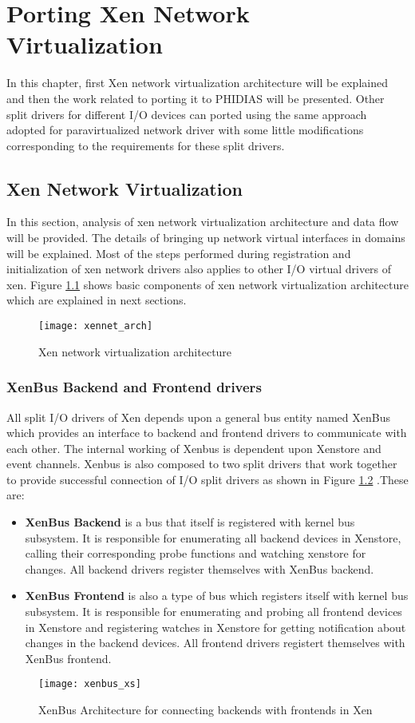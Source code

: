 \chapter{Porting Xen Network Virtualization\label{cha:chapter6}}
In this chapter, first Xen network virtualization architecture will be explained and then the work related to porting it to PHIDIAS will be presented. Other split drivers for different I/O devices can ported using the same approach adopted for paravirtualized network driver with some little modifications corresponding to the requirements for these split drivers.

\section{Xen Network Virtualization \label{sec:xennetwork}}
In this section, analysis of xen network virtualization architecture and data flow will be provided. The details of bringing up network virtual interfaces in domains will be explained. Most of the steps performed during registration and initialization of xen network drivers also applies to other I/O virtual drivers of xen. Figure \ref{xennet_arch} shows basic components of xen network virtualization architecture which are explained in next sections.
\begin{figure}[!htbp]
	\centering
	\texttt{[image: xennet\_arch]}
	\caption{Xen network virtualization architecture}
	\label{xennet_arch}
\end{figure}

\subsection{XenBus Backend and Frontend drivers \label{sec:xenbus}}
All split I/O drivers of Xen depends upon a general bus entity named XenBus which provides an interface to backend and frontend drivers to communicate with each other. The internal working of Xenbus is dependent upon Xenstore and event channels. Xenbus is also composed to two split drivers that work together to provide successful connection of I/O split drivers as shown in Figure \ref{xenbus_xs} .These are:
\begin{itemize}
	\item \textbf{XenBus Backend} is a bus that itself is registered with kernel bus subsystem. It is responsible for enumerating all backend devices in Xenstore, calling their corresponding probe functions and watching xenstore for changes. All backend drivers register themselves with XenBus backend.
	\item \textbf{XenBus Frontend} is also a type of bus which registers itself with kernel bus subsystem. It is responsible for enumerating and probing all frontend devices in Xenstore and registering watches in Xenstore for getting notification about changes in the backend devices. All frontend drivers registert themselves with XenBus frontend.
\end{itemize}
\begin{figure}[!htbp]
	\centering
	\texttt{[image: xenbus\_xs]}
	\caption{XenBus Architecture for connecting backends with frontends in Xen}
	\label{xenbus_xs}
\end{figure}


